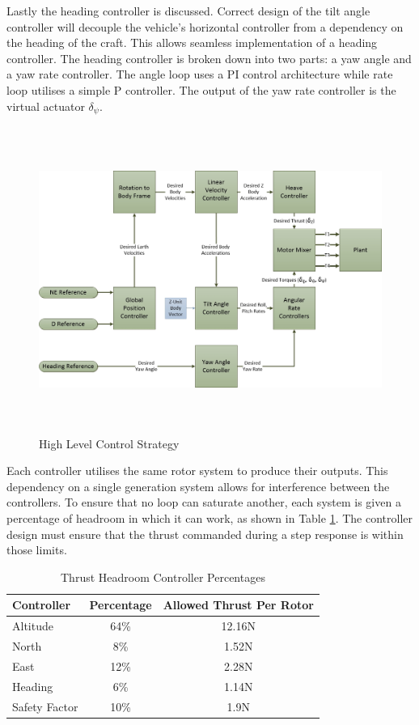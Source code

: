 Lastly the heading controller is discussed. Correct design of the tilt angle controller will decouple the vehicle's horizontal controller from a dependency on the heading of the craft. This allows seamless implementation of a heading controller. The heading controller is broken down into two parts: a yaw angle and a yaw rate controller. The angle loop uses a PI control architecture while rate loop utilises a simple P controller. The output of the yaw rate controller is the virtual actuator $\delta_\psi$.

\begin{figure}[H]
 	\centering
 	\includegraphics[height = 10cm]{../References/Diagrams/HighLevel.jpg}
 	\caption{High Level Control Strategy}
 	\label{IM_ControlStrategy}
\end{figure}

Each controller utilises the same rotor system to produce their outputs. This dependency on a single generation system allows for interference between the controllers. To ensure that no loop can saturate another, each system is given a percentage of headroom in which it can work, as shown in Table \ref{tab:HeadRoomPercentages}. The controller design must ensure that the thrust commanded during a step response is within those limits.

\begin{table}[H]
 	\centering
 	\begin{tabular}{l | c | c |}
 		Controller 				& Percentage & Allowed Thrust Per Rotor\\
 		\hline\hline
 		Altitude 	   			& 64\% & 12.16N	\\
 		North  		    		& 8\%  & 1.52N	\\
 		East					& 12\% & 2.28N	\\
 		Heading 		    	& 6\%  & 1.14N	\\
 		Safety Factor 			& 10\% & 1.9N   \\
 	\end{tabular}
 	\caption{Thrust Headroom Controller Percentages}
 	\label{tab:HeadRoomPercentages}
\end{table}
	 
